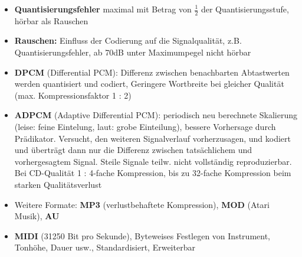 \documentclass[12pt,landscape]{article}
\begin{document}
\begin{multicols}{3}
\begin{itemize}
\item \textbf{Quantisierungsfehler} maximal mit Betrag von $\frac{1}{2}$ der Quantisierungsstufe, hörbar als Rauschen
\item \textbf{Rauschen:} Einfluss der Codierung auf die Signalqualität, z.B. Quantisierungsfehler, ab 70dB unter Maximumpegel nicht hörbar
\item \textbf{DPCM} (Differential PCM): Differenz zwischen benachbarten Abtastwerten werden quantisiert und codiert, Geringere Wortbreite bei gleicher Qualität (max. Kompressionsfaktor 1 : 2)
\item \textbf{ADPCM} (Adaptive Differential PCM): periodisch neu berechnete Skalierung (leise: feine Eintelung, laut: grobe Einteilung), bessere Vorhersage durch Prädikator. Versucht, den weiteren Signalverlauf vorherzusagen, und kodiert und überträgt dann nur die Differenz zwischen tatsächlichem und vorhergesagtem Signal. Steile Signale teilw. nicht vollständig reproduzierbar. Bei CD-Qualität 1 : 4-fache Kompression, bis zu 32-fache Kompression beim starken Qualitätsverlust
\item Weitere Formate: \textbf{MP3} (verlustbehaftete Kompression), \textbf{MOD} (Atari Musik), \textbf{AU}
\item \textbf{MIDI} (31250 Bit pro Sekunde), Byteweises Festlegen von Instrument, Tonhöhe, Dauer usw., Standardisiert, Erweiterbar
\end{itemize}

\end{multicols}
\end{document}
